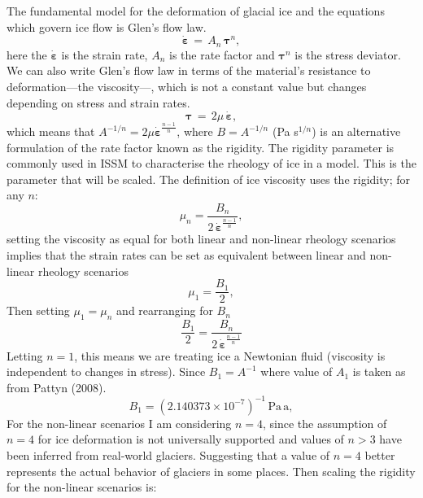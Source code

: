 The fundamental model for the deformation of glacial ice and the equations which govern ice flow is Glen's flow law. 
\begin{equation}
\mathbf{\dot{\varepsilon}} \,=\, A_{n}\,\mathbf{\tau}^{n},
\end{equation}
here the $\mathbf{\dot{\varepsilon}}$ is the strain rate, $A_n$ is the rate factor and $\mathbf{\tau}^{n}$ is the stress deviator.
We can also write Glen's flow law in terms of the material's resistance to deformation—the viscosity—, which is not a constant value but changes depending on stress and strain rates.
\begin{equation}
\mathbf{\tau}\,=\, 2\mu\,\mathbf{\dot{\varepsilon}},
\end{equation}
which means that $A^{-1/n} = 2\mu \mathbf{\dot{\varepsilon}}^{\frac{n-1}{n}}$, where $B=A^{-1/n}$ (Pa s$^{1/n}$) is an alternative formulation of the rate factor known as the rigidity. The rigidity parameter is commonly used in ISSM to characterise the rheology of ice in a model. This is the parameter that will be scaled.
The definition of ice viscosity uses the rigidity; for any $n$:
\begin{equation}
\mu_n = \frac{B_n}{2\,\mathbf{\dot{\varepsilon}}^{\frac{n-1}{n}}},
\end{equation}
setting the viscosity as equal for both linear and non-linear rheology scenarios implies that the strain rates can be set as equivalent between linear and non-linear rheology scenarios
\begin{equation}
\mu_1 = \frac{B_1}{2},
\end{equation}
Then setting $\mu_1 = \mu_n$ and rearranging for $B_n$
\begin{equation}
\frac{B_1}{2} = \frac{B_n}{2\,\mathbf{\dot{\varepsilon}}^{\frac{n-1}{n}}}
\end{equation}
Letting $n = 1$, this means we are treating ice a Newtonian fluid (viscosity is independent to changes in stress). Since $B_{1}=A^{-1}$ where value of $A_{1}$ is taken as from Pattyn (2008). 
\begin{equation}
B_{1} = (2.140373×10^{-7})^{-1}\,\mathrm{Pa\,a},
\end{equation}
For the non-linear scenarios I am considering $n=4$, since the assumption of $n = 4$ for ice deformation is not universally supported and values of $n > 3$ have been inferred from real‐world glaciers. Suggesting that a value of $n=4$ better represents the actual behavior of glaciers in some places\cite{Getraer_2025}. Then scaling the rigidity for the non-linear scenarios is:
